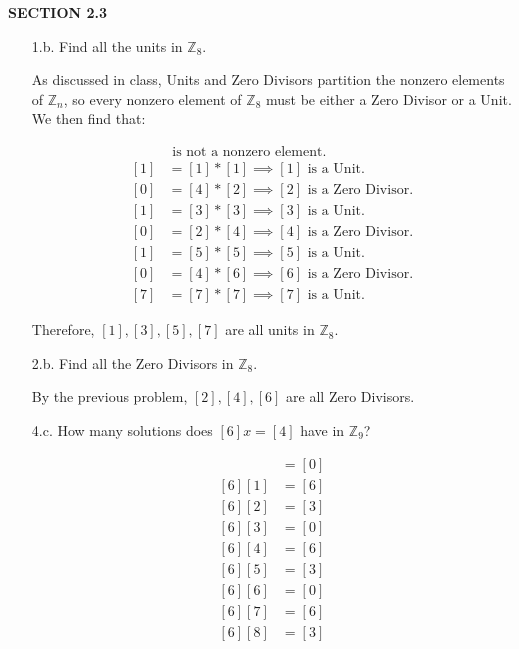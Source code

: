 \documentclass{article}
\begin{document}
	\textbf{SECTION 2.3} \\
	\begin{enumerate}
		\item [1.b.] Find all the units in $\mathbb{Z}_8$.

			As discussed in class, Units and Zero Divisors partition the nonzero elements of 
			$\mathbb{Z}_n$, so every nonzero element of $\mathbb{Z}_8$ must be either a Zero 
			Divisor or a Unit. We then find that:

			\begin{align*}
				[0] & \text{ is not a nonzero element.} \\
				[1] & = [1] * [1] \implies [1] \text{ is a Unit.} \\
				[0] & = [4] * [2] \implies [2] \text{ is a Zero Divisor.} \\
				[1] & = [3] * [3] \implies [3] \text{ is a Unit.} \\
				[0] & = [2] * [4] \implies [4] \text{ is a Zero Divisor.} \\
				[1] & = [5] * [5] \implies [5] \text{ is a Unit.} \\
				[0] & = [4] * [6] \implies [6] \text{ is a Zero Divisor.} \\
				[7] & = [7] * [7] \implies [7] \text{ is a Unit.}
			\end{align*}

			Therefore, $[1], [3], [5], [7]$ are all units in $\mathbb{Z}_8$.

		\item [2.b.] Find all the Zero Divisors in $\mathbb{Z}_8$.

			By the previous problem, $[2], [4], [6]$ are all Zero Divisors.

		\item [4.c.] How many solutions does $[6]x = [4]$ have in $\mathbb{Z}_9$?

			\begin{align*}
				[6][0] & = [0] \\
				[6][1] & = [6] \\
				[6][2] & = [3] \\
				[6][3] & = [0] \\
				[6][4] & = [6] \\
				[6][5] & = [3] \\
				[6][6] & = [0] \\
				[6][7] & = [6] \\
				[6][8] & = [3]
			\end{align*}


\end{enumerate}
\end{document}

